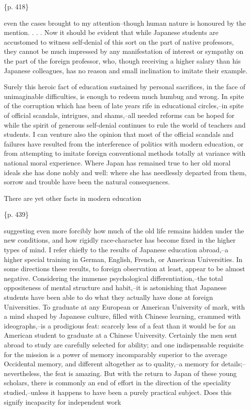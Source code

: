 \{p. 418\}

even the cases brought to my attention--though human nature is honoured by the mention. . . . Now it should be evident that while Japanese students are accustomed to witness self-denial of this sort on the part of native professors, they cannot be much impressed by any manifestation of interest or sympathy on the part of the foreign professor, who, though receiving a higher salary than his Japanese colleagues, has no reason and small inclination to imitate their example.

Surely this heroic fact of education sustained by personal sacrifices, in the face of unimaginable difficulties, is enough to redeem much humbug and wrong. In spite of the corruption which has been of late years rife in educational circles,--in spite of official scandals, intrigues, and shams,--all needed reforms can be hoped for while the spirit of generous self-denial continues to rule the world of teachers and students. I can venture also the opinion that most of the official scandals and failures have resulted from the interference of politics with modern education, or from attempting to imitate foreign conventional methods totally at variance with national moral experience. Where Japan has remained true to her old moral ideals she has done nobly and well: where she has needlessly departed from them, sorrow and trouble have been the natural consequences.



There are yet other facts in modern education

\{p. 439\}

suggesting even more forcibly how much of the old life remains hidden under the new conditions, and how rigidly race-character has become fixed in the higher types of mind. I refer chiefly to the results of Japanese education abroad,--a higher special training in German, English, French, or American Universities. In some directions these results, to foreign observation at least, appear to be almost negative. Considering the immense psychological differentiation,--the total oppositeness of mental structure and habit,--it is astonishing that Japanese students have been able to do what they actually have done at foreign Universities. To graduate at any European or American University of mark, with a mind shaped by Japanese culture, filled with Chinese learning, crammed with ideographs,--is a prodigious feat: scarcely less of a feat than it would be for an American student to graduate at a Chinese University. Certainly the men sent abroad to study are carefully selected for ability; and one indispensable requisite for the mission is a power of memory incomparably superior to the average Occidental memory, and different altogether as to quality,--a memory for details;--nevertheless, the feat is amazing. But with the return to Japan of these young scholars, there is commonly an end of effort in the direction of the speciality studied,--unless it happens to have been a purely practical subject. Does this signify incapacity for independent work

